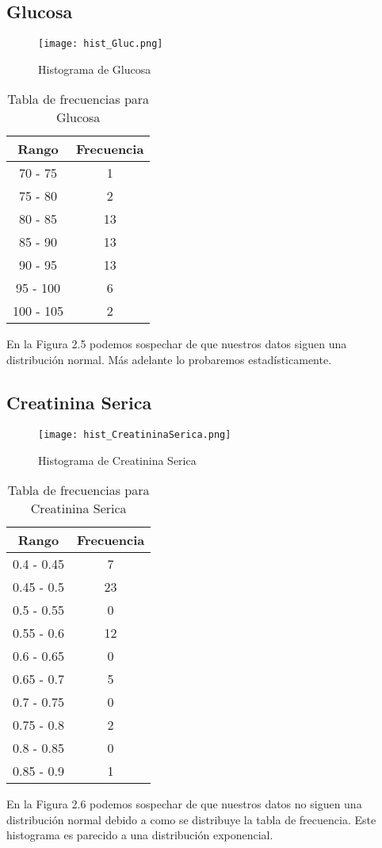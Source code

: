 \documentclass[12pt]{report}
\begin{document}
\subsection{Glucosa}
\begin{figure}[H]
    \centering
    \texttt{[image: hist\_Gluc.png]}
    \caption{Histograma de Glucosa}
\end{figure}

\begin{table}[H]
    \centering
    \begin{tabular}{|c|c|}
        \hline
        \textbf{Rango} & \textbf{Frecuencia} \\
        \hline
        70 - 75 & 1 \\
        75 - 80 & 2 \\
        80 - 85 & 13 \\
        85 - 90 & 13 \\
        90 - 95 & 13 \\
        95 - 100 & 6 \\
        100 - 105 & 2 \\
        \hline
    \end{tabular}
    \caption{Tabla de frecuencias para Glucosa}
\end{table}
\noindent En la Figura 2.5 podemos sospechar de que nuestros datos siguen una distribución normal. Más adelante lo probaremos estadísticamente.

\subsection{Creatinina Serica}
\begin{figure}[H]
    \centering
    \texttt{[image: hist\_CreatininaSerica.png]}
    \caption{Histograma de Creatinina Serica}
\end{figure}

\begin{table}[H]
    \centering
    \begin{tabular}{|c|c|}
        \hline
        \textbf{Rango} & \textbf{Frecuencia} \\
        \hline
        0.4 - 0.45 & 7 \\
        0.45 - 0.5 & 23 \\
        0.5 - 0.55 & 0 \\
        0.55 - 0.6 & 12 \\
        0.6 - 0.65 & 0 \\
        0.65 - 0.7 & 5 \\
        0.7 - 0.75 & 0 \\
        0.75 - 0.8 & 2 \\
        0.8 - 0.85 & 0 \\
        0.85 - 0.9 & 1 \\
        \hline
    \end{tabular}
    \caption{Tabla de frecuencias para Creatinina Serica}
\end{table}
\noindent En la Figura 2.6 podemos sospechar de que nuestros datos no siguen una distribución normal debido a como se distribuye la tabla de frecuencia. Este histograma es parecido a una distribución exponencial.
\end{document}
